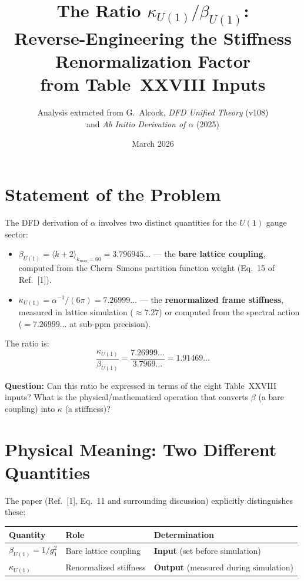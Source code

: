 \documentclass[12pt,a4paper]{article}
\title{The Ratio $\kappa_{U(1)}/\beta_{U(1)}$:\\[6pt]
\large Reverse-Engineering the Stiffness Renormalization Factor\\
from Table~XXVIII Inputs}
\author{Analysis extracted from G.\ Alcock, \textit{DFD Unified Theory} (v108)\\
and \textit{Ab Initio Derivation of $\alpha$} (2025)}
\date{March 2026}
\begin{document}
\maketitle

\section{Statement of the Problem}

The DFD derivation of $\alpha$ involves two distinct quantities for the
$U(1)$ gauge sector:
\begin{itemize}
\item $\beta_{U(1)} = \langle k+2 \rangle_{k_{\max}=60} = 3.796945\ldots$
  --- the \textbf{bare lattice coupling}, computed from the Chern--Simons
  partition function weight (Eq.~15 of Ref.~[1]).
\item $\kappa_{U(1)} = \alpha^{-1}/(6\pi) = 7.26999\ldots$
  --- the \textbf{renormalized frame stiffness}, measured in lattice
  simulation ($\approx 7.27$) or computed from the spectral action
  ($= 7.26999\ldots$ at sub-ppm precision).
\end{itemize}

The ratio is:
\begin{equation}
\boxed{
\frac{\kappa_{U(1)}}{\beta_{U(1)}}
= \frac{7.26999\ldots}{3.7969\ldots}
= 1.91469\ldots
}
\end{equation}

\textbf{Question:} Can this ratio be expressed in terms of the eight
Table~XXVIII inputs?  What is the physical/mathematical operation that
converts $\beta$ (a bare coupling) into $\kappa$ (a stiffness)?

\section{Physical Meaning: Two Different Quantities}

The paper (Ref.~[1], Eq.~11 and surrounding discussion) explicitly
distinguishes these:

\begin{center}
\renewcommand{\arraystretch}{1.3}
\begin{tabular}{lll}
\toprule
\textbf{Quantity} & \textbf{Role} & \textbf{Determination} \\
\midrule
$\beta_{U(1)} = 1/g_1^2$ & Bare lattice coupling & \textbf{Input} (set before simulation) \\
$\kappa_{U(1)}$ & Renormalized stiffness & \textbf{Output} (measured during simulation) \\
\bottomrule
\end{tabular}
\end{center}
\end{document}
